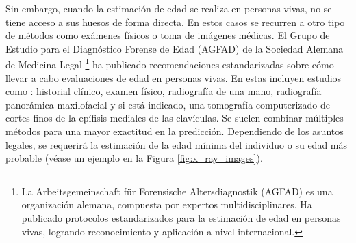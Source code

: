 Sin embargo, cuando la estimación de edad se realiza en personas vivas, no se tiene acceso a sus huesos de forma directa. En estos casos se recurren a otro tipo de métodos como exámenes físicos o toma de imágenes médicas. El Grupo de Estudio para el Diagnóstico Forense de Edad (AGFAD) de la Sociedad Alemana de Medicina Legal%
\footnote{
    La Arbeitsgemeinschaft für Forensische Altersdiagnostik (AGFAD) es una organización alemana, compuesta por expertos multidisciplinares. Ha publicado protocolos estandarizados para la estimación de edad en personas vivas, logrando reconocimiento y aplicación a nivel internacional.
} 
ha publicado recomendaciones estandarizadas sobre cómo llevar a cabo evaluaciones de edad en personas vivas. En estas incluyen estudios como \cite{schmeling2016}: historial clínico, examen físico, radiografía de una mano, radiografía panorámica maxilofacial y si está indicado, una tomografía computerizado de cortes finos de la epífisis mediales de las clavículas. Se suelen combinar múltiples métodos para una mayor exactitud en la predicción. Dependiendo de los asuntos legales, se requerirá la estimación de la edad mínima del individuo o su edad más probable \cite{schmeling2016} (véase un ejemplo en la Figura \ref{fig:x_ray_images}). 

